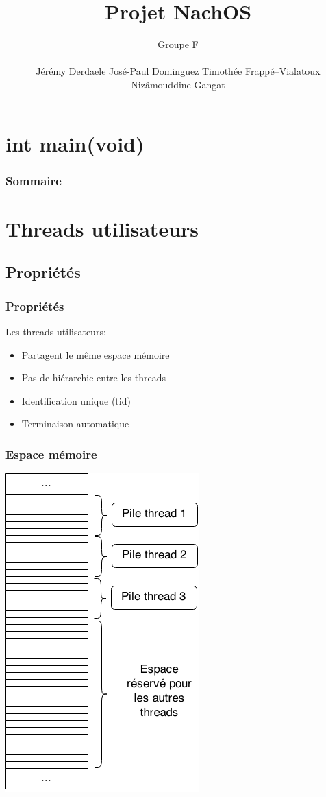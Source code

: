 \documentclass{beamer}
\title{Projet NachOS}
\author{
  Groupe F \newline{}
  {\rule{5cm}{0.4pt}}\newline{}
  Jérémy Derdaele\newline{}
  José-Paul Dominguez\newline{}
  Timothée Frappé--Vialatoux\newline{}
  Nizâmouddine Gangat\newline{}
  {\rule{5cm}{0.4pt}}\newline{}
}
\begin{document}
\begin{frame}
  \titlepage
\end{frame}

\section*{int main(void)}
\begin{frame}
  \frametitle{Sommaire}
  \tableofcontents
\end{frame}

\section{Threads utilisateurs}
\subsection{Propriétés}
\begin{frame}
  \frametitle{Propriétés}
  Les threads utilisateurs:
  \begin{itemize}
  \item Partagent le même espace mémoire
  \item Pas de hiérarchie entre les threads
  \item Identification unique (tid)
  \item Terminaison automatique
  \end{itemize}
\end{frame}

\begin{frame}
  \frametitle{Espace mémoire}
  \begin{center}
    \includegraphics[scale=0.4]{user_threads.png}
  \end{center}
\end{frame}
\end{document}
